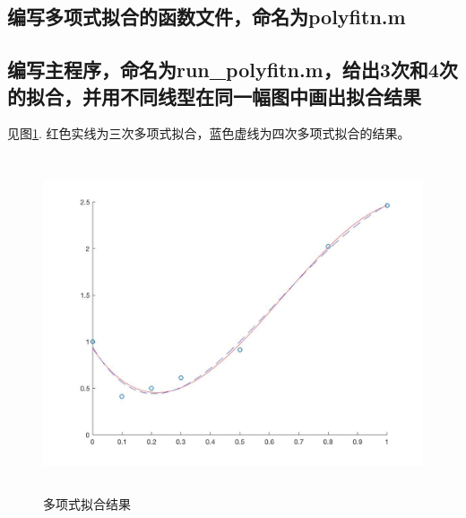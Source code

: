 \subsection{编写多项式拟合的函数文件，命名为polyfitn.m}
  

\subsection{编写主程序，命名为run\_polyfitn.m，给出3次和4次的拟合，并用不同线型在同一幅图中画出拟合结果}
  见图\ref{fig: 多项式拟合}. 红色实线为三次多项式拟合，蓝色虚线为四次多项式拟合的结果。
  \begin{figure}[htbp]
    \centering
    \includegraphics[height=9.9cm]{../image/run_polyfitn.jpg}
    \caption{多项式拟合结果}
    \label{fig: 多项式拟合}
  \end{figure}
  

